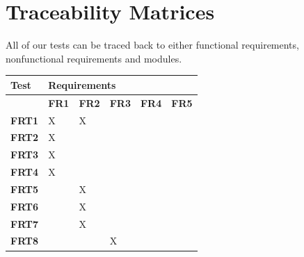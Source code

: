 \documentclass[12pt, titlepage]{article}
\begin{document}
\section{Traceability Matrices}
All of our tests can be traced back to either functional requirements, nonfunctional requirements and modules.
\begin{table}[H]
  \centering
  \begin{tabular}{|l|lllll|}
  \hline
  \textbf{Test}  & \multicolumn{5}{l|}{\textbf{Requirements}}                                                                                                                   \\ \hline
                 & \multicolumn{1}{l|}{\textbf{FR1}} & \multicolumn{1}{l|}{\textbf{FR2}} & \multicolumn{1}{l|}{\textbf{FR3}} & \multicolumn{1}{l|}{\textbf{FR4}} & \textbf{FR5} \\ \hline
  \textbf{FRT1}  & \multicolumn{1}{l|}{X}            & \multicolumn{1}{l|}{X}            & \multicolumn{1}{l|}{}             & \multicolumn{1}{l|}{}             &              \\ \hline
  \textbf{FRT2}  & \multicolumn{1}{l|}{X}            & \multicolumn{1}{l|}{}             & \multicolumn{1}{l|}{}             & \multicolumn{1}{l|}{}             &              \\ \hline
  \textbf{FRT3}  & \multicolumn{1}{l|}{X}            & \multicolumn{1}{l|}{}             & \multicolumn{1}{l|}{}             & \multicolumn{1}{l|}{}             &              \\ \hline
  \textbf{FRT4}  & \multicolumn{1}{l|}{X}            & \multicolumn{1}{l|}{}             & \multicolumn{1}{l|}{}             & \multicolumn{1}{l|}{}             &              \\ \hline
  \textbf{FRT5}  & \multicolumn{1}{l|}{}             & \multicolumn{1}{l|}{X}            & \multicolumn{1}{l|}{}             & \multicolumn{1}{l|}{}             &              \\ \hline
  \textbf{FRT6}  & \multicolumn{1}{l|}{}             & \multicolumn{1}{l|}{X}            & \multicolumn{1}{l|}{}             & \multicolumn{1}{l|}{}             &              \\ \hline
  \textbf{FRT7}  & \multicolumn{1}{l|}{}             & \multicolumn{1}{l|}{X}            & \multicolumn{1}{l|}{}             & \multicolumn{1}{l|}{}             &              \\ \hline
  \textbf{FRT8}  & \multicolumn{1}{l|}{}             & \multicolumn{1}{l|}{}             & \multicolumn{1}{l|}{X}            & \multicolumn{1}{l|}{}             &              \\ \hline

\end{tabular}
\end{table}
\end{document}
